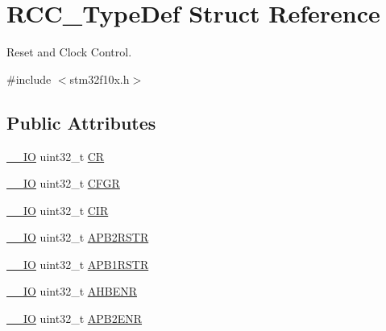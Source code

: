 \hypertarget{struct_r_c_c___type_def}{\section{R\-C\-C\-\_\-\-Type\-Def Struct Reference}
\label{struct_r_c_c___type_def}
}


Reset and Clock Control.  




{\ttfamily \#include $<$stm32f10x.\-h$>$}

\subsection*{Public Attributes}
\begin{DoxyCompactItemize}
\item 
\hyperlink{group___c_m_s_i_s__core__definitions_gaec43007d9998a0a0e01faede4133d6be}{\-\_\-\-\_\-\-I\-O} uint32\-\_\-t \hyperlink{struct_r_c_c___type_def_abcb9ff48b9afb990283fefad0554b5b3}{C\-R}
\item 
\hyperlink{group___c_m_s_i_s__core__definitions_gaec43007d9998a0a0e01faede4133d6be}{\-\_\-\-\_\-\-I\-O} uint32\-\_\-t \hyperlink{struct_r_c_c___type_def_a0721b1b729c313211126709559fad371}{C\-F\-G\-R}
\item 
\hyperlink{group___c_m_s_i_s__core__definitions_gaec43007d9998a0a0e01faede4133d6be}{\-\_\-\-\_\-\-I\-O} uint32\-\_\-t \hyperlink{struct_r_c_c___type_def_aeadf3a69dd5795db4638f71938704ff0}{C\-I\-R}
\item 
\hyperlink{group___c_m_s_i_s__core__definitions_gaec43007d9998a0a0e01faede4133d6be}{\-\_\-\-\_\-\-I\-O} uint32\-\_\-t \hyperlink{struct_r_c_c___type_def_a4491ab20a44b70bf7abd247791676a59}{A\-P\-B2\-R\-S\-T\-R}
\item 
\hyperlink{group___c_m_s_i_s__core__definitions_gaec43007d9998a0a0e01faede4133d6be}{\-\_\-\-\_\-\-I\-O} uint32\-\_\-t \hyperlink{struct_r_c_c___type_def_a600f4d6d592f43edb2fc653c5cba023a}{A\-P\-B1\-R\-S\-T\-R}
\item 
\hyperlink{group___c_m_s_i_s__core__definitions_gaec43007d9998a0a0e01faede4133d6be}{\-\_\-\-\_\-\-I\-O} uint32\-\_\-t \hyperlink{struct_r_c_c___type_def_abaebc9204bbc1708356435a5a01e70eb}{A\-H\-B\-E\-N\-R}
\item 
\hyperlink{group___c_m_s_i_s__core__definitions_gaec43007d9998a0a0e01faede4133d6be}{\-\_\-\-\_\-\-I\-O} uint32\-\_\-t \hyperlink{struct_r_c_c___type_def_a619b4c22f630a269dfd0c331f90f6868}{A\-P\-B2\-E\-N\-R}
\item 

\end{DoxyCompactItemize}
